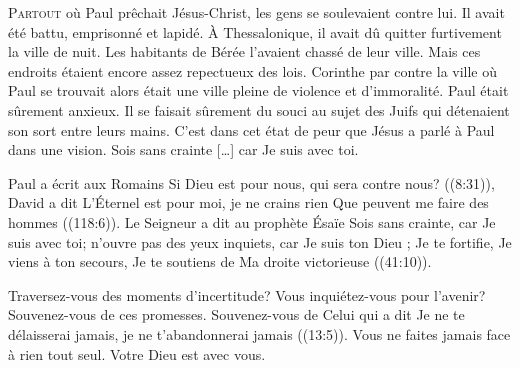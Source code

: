 


\lettrine{P}{artout} où Paul prêchait Jésus-Christ,
 les gens se soulevaient contre lui.
 Il avait été battu, emprisonné et lapidé.
 À Thessalonique, il avait dû quitter furtivement la ville de nuit.
 Les habitants de Bérée l'avaient chassé de leur ville.
 Mais ces endroits étaient encore assez repectueux des lois.
 Corinthe par contre \ocadr la ville où Paul se trouvait alors \fcadr{} était
 une ville pleine de violence et d'immoralité.
 Paul était sûrement anxieux.
 Il se faisait sûrement du souci au sujet des Juifs qui détenaient
 son sort entre leurs mains. C'est dans cet état de peur que Jésus
 a parlé à Paul dans une vision.
 \Og Sois sans crainte [\dots{}] car Je suis avec toi. \Fg{}


Paul a écrit aux Romains\frcolon{} 
 \Og Si Dieu est pour nous, qui sera contre nous? \Fg{} ((8:31)),
 David a dit\frcolon{} 
 \Og L'Éternel est pour moi, je ne crains rien\frcolon{}
 Que peuvent me faire des hommes \Fg{} ((118:6)).
 Le Seigneur a dit au prophète Ésaïe\frcolon{} 
 \Og Sois sans crainte, car Je suis avec toi; n'ouvre pas des yeux inquiets,
 car Je suis ton Dieu ; Je te fortifie, Je viens à ton secours,
 Je te soutiens de Ma droite victorieuse \Fg{} ((41:10)).

Traversez-vous des moments d'incertitude? Vous inquiétez-vous pour l'avenir?
 Souvenez-vous de ces promesses. Souvenez-vous de Celui qui a dit\frcolon{} 
 \Og Je ne te délaisserai jamais, je ne t'abandonnerai jamais \Fg{}
 ((13:5)).
 Vous ne faites jamais face à rien tout seul. Votre Dieu est avec vous.

\dvrule



